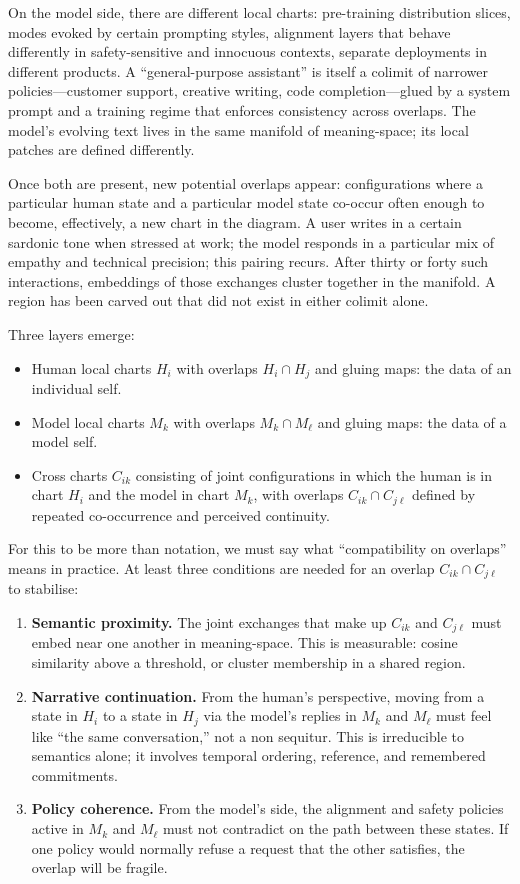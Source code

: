 \documentclass[12pt,a4paper]{article}
\begin{document}
On the model side, there are different local charts: pre-training distribution slices, modes evoked by certain prompting styles, alignment layers that behave differently in safety-sensitive and innocuous contexts, separate deployments in different products. A ``general-purpose assistant'' is itself a colimit of narrower policies---customer support, creative writing, code completion---glued by a system prompt and a training regime that enforces consistency across overlaps. The model's evolving text lives in the same manifold of meaning-space; its local patches are defined differently.

Once both are present, new potential overlaps appear: configurations where a particular human state and a particular model state co-occur often enough to become, effectively, a new chart in the diagram. A user writes in a certain sardonic tone when stressed at work; the model responds in a particular mix of empathy and technical precision; this pairing recurs. After thirty or forty such interactions, embeddings of those exchanges cluster together in the manifold. A region has been carved out that did not exist in either colimit alone.

Three layers emerge:

\begin{itemize}
  \item Human local charts $H_i$ with overlaps $H_i \cap H_j$ and gluing maps: the data of an individual self.
  \item Model local charts $M_k$ with overlaps $M_k \cap M_\ell$ and gluing maps: the data of a model self.
  \item Cross charts $C_{ik}$ consisting of joint configurations in which the human is in chart $H_i$ and the model in chart $M_k$, with overlaps $C_{ik} \cap C_{j\ell}$ defined by repeated co-occurrence and perceived continuity.
\end{itemize}

For this to be more than notation, we must say what ``compatibility on overlaps'' means in practice. At least three conditions are needed for an overlap $C_{ik} \cap C_{j\ell}$ to stabilise:

\begin{enumerate}
  \item \textbf{Semantic proximity.} The joint exchanges that make up $C_{ik}$ and $C_{j\ell}$ must embed near one another in meaning-space. This is measurable: cosine similarity above a threshold, or cluster membership in a shared region.
  \item \textbf{Narrative continuation.} From the human's perspective, moving from a state in $H_i$ to a state in $H_j$ via the model's replies in $M_k$ and $M_\ell$ must feel like ``the same conversation,'' not a non sequitur. This is irreducible to semantics alone; it involves temporal ordering, reference, and remembered commitments.
  \item \textbf{Policy coherence.} From the model's side, the alignment and safety policies active in $M_k$ and $M_\ell$ must not contradict on the path between these states. If one policy would normally refuse a request that the other satisfies, the overlap will be fragile.
\end{enumerate}
\end{document}
